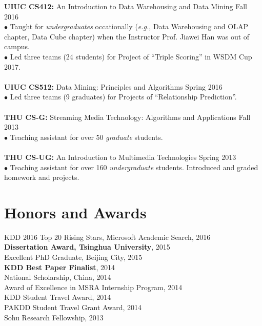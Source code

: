 \documentclass[margin, 10pt]{res}
\begin{document}
\begin{resume}
{\textbf{UIUC CS412:} An Introduction to Data Warehousing and Data Mining} \hfill {Fall 2016} \\
$\bullet$ Taught for \textit{undergraduates} occationally (\textit{e.g.}, Data Warehousing and OLAP chapter, Data Cube chapter) when the Instructor Prof. Jiawei Han was out of campus. \\
$\bullet$ Led three teams (24 students) for Project of ``Triple Scoring'' in WSDM Cup 2017. \\ \\
{\textbf{UIUC CS512:} Data Mining: Principles and Algorithms} \hfill {Spring 2016} \\
$\bullet$ Led three teams (9 graduates) for Projects of ``Relationship Prediction''. \\ \\
{\textbf{THU CS-G:} Streaming Media Technology: Algorithms and Applications} \hfill {Fall 2013} \\
$\bullet$ Teaching assistant for over 50 \textit{graduate} students. \\ \\
{\textbf{THU CS-UG:} An Introduction to Multimedia Technologies} \hfill {Spring 2013} \\
$\bullet$ Teaching assistant for over 160 \textit{undergraduate} students. Introduced and graded homework and projects.


\section{Honors and Awards}

KDD 2016 Top 20 Rising Stars, Microsoft Academic Search, 2016 \\
{\bf Dissertation Award, Tsinghua University}, 2015 \\
{Excellent PhD Graduate, Beijing City}, 2015 \\
{\bf KDD Best Paper Finalist}, 2014 \\
{National Scholarship, China}, 2014 \\
{Award of Excellence in MSRA Internship Program}, 2014 \\
{KDD Student Travel Award}, 2014 \\
{PAKDD Student Travel Grant Award}, 2014 \\
{Sohu Research Fellowship}, 2013


\end{resume}
\end{document}
